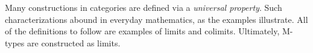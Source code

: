 \documentclass[a5paper]{article}
\newcommand{\dual}[2]{
  \begin{itemize}\renewcommand{\labelitemi}{$\circ $}
    \itemsep0em
    \item #1
    \item #2
   \end{itemize}
}
\begin{document}
Many constructions in categories are defined via a \textit{universal property}.
Such characterizations abound in everyday mathematics, as the examples
illustrate. All of the definitions to follow are examples of limits and colimits.
Ultimately, M-types are constructed as limits.

\end{document}
